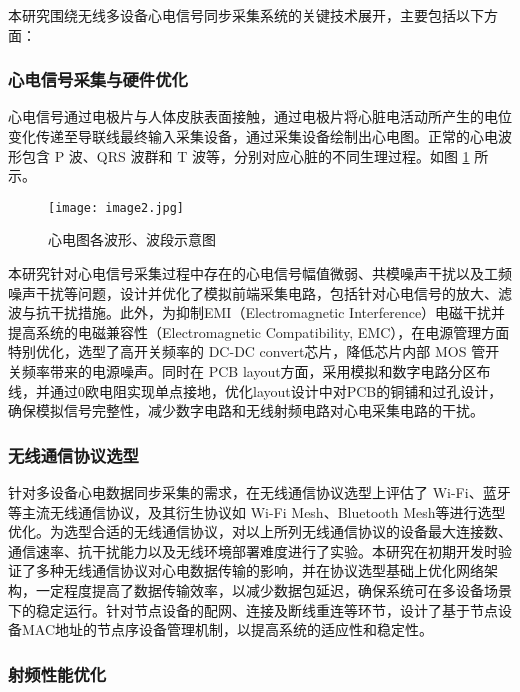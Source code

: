 本研究围绕无线多设备心电信号同步采集系统的关键技术展开，主要包括以下方面：

\subsubsection{心电信号采集与硬件优化}

心电信号通过电极片与人体皮肤表面接触，通过电极片将心脏电活动所产生的电位变化传递至导联线最终输入采集设备，通过采集设备绘制出心电图。正常的心电波形包含 P 波、QRS 波群和 T 波等，分别对应心脏的不同生理过程。如图 \ref{F.ECG_image2} 所示。

\begin{figure}[hbt]
    \centering
    \texttt{[image: image2.jpg]}
    \caption{心电图各波形、波段示意图\cite{一学就会心电图}}
    \label{F.ECG_image2}
\end{figure}

本研究针对心电信号采集过程中存在的心电信号幅值微弱、共模噪声干扰以及工频噪声干扰等问题，设计并优化了模拟前端采集电路，包括针对心电信号的放大、滤波与抗干扰措施。此外，为抑制EMI（Electromagnetic Interference）电磁干扰并提高系统的电磁兼容性（Electromagnetic Compatibility, EMC），在电源管理方面特别优化，选型了高开关频率的 DC-DC convert芯片，降低芯片内部 MOS 管开关频率带来的电源噪声。同时在 PCB layout方面，采用模拟和数字电路分区布线，并通过0欧电阻实现单点接地，优化layout设计中对PCB的铜铺和过孔设计，确保模拟信号完整性，减少数字电路和无线射频电路对心电采集电路的干扰。

\subsubsection{无线通信协议选型}

针对多设备心电数据同步采集的需求，在无线通信协议选型上评估了 Wi-Fi、蓝牙等主流无线通信协议，及其衍生协议如 Wi-Fi Mesh、Bluetooth Mesh等进行选型优化。为选型合适的无线通信协议，对以上所列无线通信协议的设备最大连接数、通信速率、抗干扰能力以及无线环境部署难度进行了实验。本研究在初期开发时验证了多种无线通信协议对心电数据传输的影响，并在协议选型基础上优化网络架构，一定程度提高了数据传输效率，以减少数据包延迟，确保系统可在多设备场景下的稳定运行。针对节点设备的配网、连接及断线重连等环节，设计了基于节点设备MAC地址的节点序设备管理机制，以提高系统的适应性和稳定性。

\subsubsection{射频性能优化}  

